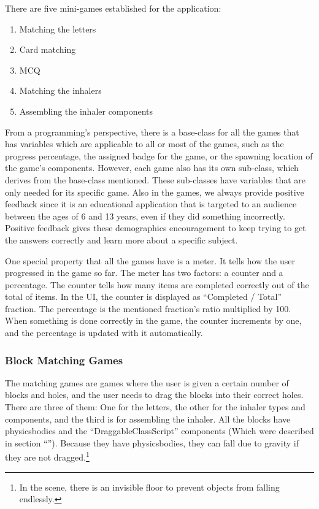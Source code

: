 There are five mini-games established for the application:
\begin{enumerate}
\item{Matching the letters}

\item{Card matching}

\item{\acrfull{MCQ}}

\item{Matching the inhalers}

\item{Assembling the inhaler components}
\end{enumerate}

From a programming’s perspective, there is a base-class for all the games that has variables which are applicable to all or most of the games, such as the progress percentage, the assigned badge for the game, or the spawning location of the game’s components. However, each game also has its own sub-class, which derives from the base-class mentioned. These sub-classes have variables that are only needed for its specific game. Also in the games, we always provide positive feedback since it is an educational application that is targeted to an audience between the ages of 6 and 13 years, even if they did something incorrectly. Positive feedback gives these demographics encouragement to keep trying to get the answers correctly and learn more about a specific subject.
 
One special property that all the games have is a meter. It tells how the user progressed in the game so far. The meter has two factors: a counter and a percentage. The counter tells how many items are completed correctly out of the total of items. In the \acrshort{UI}, the counter is displayed as “Completed / Total” fraction. The percentage is the mentioned fraction's ratio multiplied by 100. When something is done correctly in the game, the counter increments by one, and the percentage is updated with it automatically.

\subsubsection*{Block Matching Games}
The matching games are games where the user is given a certain number of blocks and holes, and the user needs to drag the blocks into their correct holes. There are three of them: One for the letters, the other for the inhaler types and components, and the third is for assembling the inhaler. All the blocks have physicsbodies and the “{\codefont DraggableClassScript}” components (Which were described in section “\textbf{}”). Because they have physicsbodies, they can fall due to gravity if they are not dragged.\footnote{In the scene, there is an invisible floor to prevent objects from falling endlessly.}

